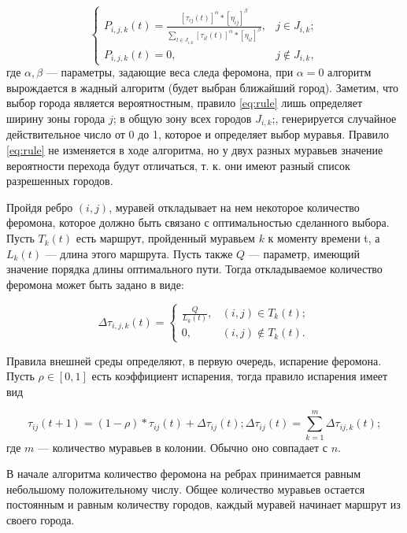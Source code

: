 \documentclass[12pt]{report}
\begin{document}
\begin{equation}
	\label{eq:rule}
	\begin{cases}
	P_{i,j,k}(t) = \frac{[\tau_{ij}(t)]^\alpha*[\eta_{ij}]^\beta}{\sum_{l\in J_{i,k}}^{}[\tau_{il}(t)]^\alpha * [\eta_{il}]^\beta}, & j \in J_{i,k};\\
	P_{i,j,k}(t) = 0, & j \notin J_{i,k},
	\end{cases}
\end{equation}
где $\alpha, \beta$ — параметры, задающие веса следа феромона, при $\alpha=0$ алгоритм вырождается в жадный алгоритм (будет выбран ближайший город). Заметим, что
выбор города является вероятностным, правило \ref{eq:rule} лишь определяет ширину
зоны города $j$; в общую зону всех городов $J_{i,k}$;, генерируется случайное действительное число от 0 до 1, которое и определяет выбор муравья. Правило \ref{eq:rule} не изменяется в ходе алгоритма, но у двух разных муравьев значение вероятности перехода будут отличаться, т. к. они имеют разный список разрешенных городов.

Пройдя ребро $(i,j)$, муравей откладывает на нем некоторое количество феромона, которое должно быть связано с оптимальностью сделанного выбора. Пусть $T_k(t)$ есть маршрут, пройденный муравьем $k$ к моменту времени t, а $L_k(t)$ --- длина этого маршрута. Пусть также $Q$ --- параметр, имеющий значение порядка длины оптимального пути. Тогда откладываемое количество феромона может быть задано в виде:

\begin{equation}
	\label{eq:pheromone_drop}
	\Delta\tau_{i,j,k}(t) =
	\begin{cases}
	\frac{Q}{L_{k}(t)}, & (i,j) \in T_{k}(t);\\
	0, & (i,j) \notin T_{k}(t).
	\end{cases}
\end{equation}

Правила внешней среды определяют, в первую очередь, испарение феромона. Пусть $\rho \in [0,1]$ есть коэффициент испарения, тогда правило испарения имеет вид

\begin{equation}
	\label{eq:pheromone_evaporation}
	\tau_{ij}(t+1) = (1 - \rho) * \tau_{ij}(t) + \Delta\tau_{ij}(t); \Delta\tau_{ij}(t) = \sum_{k = 1}^{m} \Delta\tau_{ij,k}(t); 
	\end{equation}
где $m$ — количество муравьев в колонии. Обычно оно совпадает с $n$.

В начале алгоритма количество феромона на ребрах принимается равным
небольшому положительному числу. Общее количество муравьев остается постоянным и равным количеству городов, каждый муравей начинает маршрут из своего города. 
\end{document}
